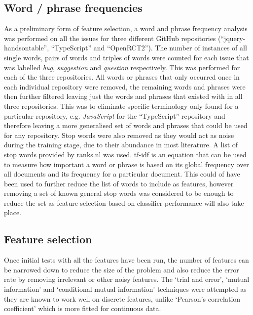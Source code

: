\subsection{Word / phrase frequencies}
\label{sec:background_wordfreq}
As a preliminary form of feature selection, a word and phrase frequency analysis was performed on all the issues for three
different GitHub repositories (``jquery-handsontable'', ``TypeScript'' and ``OpenRCT2''). The number of instances of all single
words, pairs of words and triples of words were counted for each issue that was labelled \textit{bug}, \textit{suggestion} and
\textit{question} respectively. This was performed for each of the three repositories. All words or phrases that only occurred
once in each individual repository were removed, the remaining words and phrases were then further filtered leaving just the
words and phrases that existed with in all three repositories. This was to eliminate specific terminology only found for a
particular repository, e.g. \textit{JavaScript} for the ``TypeScript'' repository and therefore leaving a more generalised set
of words and phrases that could be used for any repository. Stop words were also removed as they would act as noise during the training stage, due to their abundance in most literature. A list of stop words provided by ranks.nl \cite{ranks.nl} was used.
tf-idf is an equation that can be used to measure how important a word or phrase is based on its global frequency over all
documents and its frequency for a particular document. This could of have been used to further reduce the list of words to
include as features, however removing a set of known general stop words was considered to be enough to reduce the set as feature selection based on classifier performance will also take place.

\subsection{Feature selection}
Once initial tests with all the features have been run, the number of features can be narrowed down to reduce the size of the
problem and also reduce the error rate by removing irrelevant or other noisy features. The `trial and error',
`mutual information' and `conditional mutual information' techniques were attempted as they are known to work well on discrete
features, unlike `Pearson's correlation coefficient' which is more fitted for continuous data.

